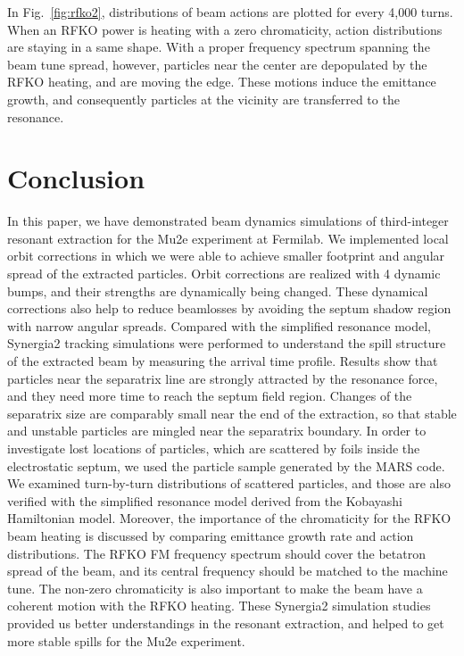 \documentclass[aps,prstab,onecolumn,preprint]{revtex4-1}
\begin{document}
In Fig.~\ref{fig:rfko2}, distributions of beam actions are plotted for every 4,000 turns. When an RFKO power is heating with a zero chromaticity, action distributions are staying in a same shape. With a proper frequency spectrum spanning the beam tune spread, however, particles near the center are depopulated by the RFKO heating, and are moving the edge. These motions induce the emittance growth, and consequently particles at the vicinity are transferred to the resonance.


\section{\label{sec:conclusion}Conclusion}

In this paper, we have demonstrated beam dynamics simulations of third-integer resonant extraction for the Mu2e experiment at Fermilab. We implemented local orbit corrections in which we were able to achieve smaller footprint and angular spread of the extracted particles. Orbit corrections are realized with 4 dynamic bumps, and their strengths are dynamically being changed. These dynamical corrections also help to reduce beamlosses by avoiding the septum shadow region with narrow angular spreads. Compared with the simplified resonance model, Synergia2 tracking simulations were performed to understand the spill structure of the extracted beam by measuring the arrival time profile. Results show that particles near the separatrix line are strongly attracted by the resonance force, and they need more time to reach the septum field region. Changes of the separatrix size are comparably small near the end of the extraction, so that stable and unstable particles are mingled near the separatrix boundary. In order to investigate lost locations of particles, which are scattered by foils inside the electrostatic septum, we used the particle sample generated by the MARS code. We examined turn-by-turn distributions of scattered particles, and those are also verified with the simplified resonance model derived from the Kobayashi Hamiltonian model. Moreover, the importance of the chromaticity for the RFKO beam heating is discussed by comparing emittance growth rate and action distributions. The RFKO FM frequency spectrum should cover the betatron spread of the beam, and its central frequency should be matched to the machine tune. The non-zero chromaticity is also important to make the beam have a coherent motion with the RFKO heating. These Synergia2 simulation studies provided us better understandings in the resonant extraction, and helped to get more stable spills for the Mu2e experiment.
\end{document}
